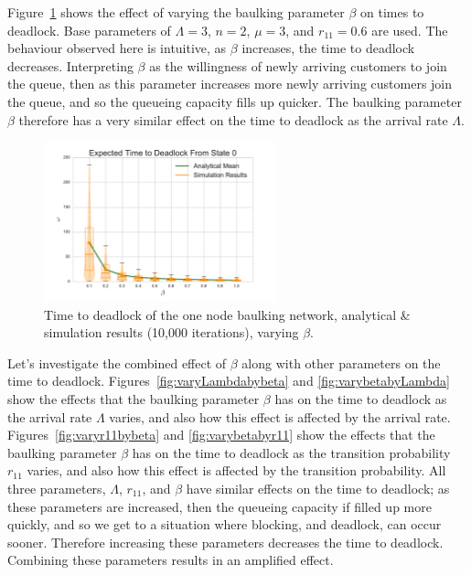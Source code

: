 \documentclass{article}
\begin{document}
Figure~\ref{fig:varybeta} shows the effect of varying the baulking parameter $\beta$ on times to deadlock. Base parameters of $\Lambda = 3$, $n = 2$, $\mu = 3$, and $r_{11} = 0.6$ are used.
The behaviour observed here is intuitive, as $\beta$ increases, the time to deadlock decreases. Interpreting $\beta$ as the willingness of newly arriving customers to join the queue, then as this parameter increases more newly arriving customers join the queue, and so the queueing capacity fills up quicker. The baulking parameter $\beta$ therefore has a very similar effect on the time to deadlock as the arrival rate $\Lambda$.

\begin{figure}
    \begin{center}
        \includegraphics[width=0.6\textwidth]{img/vary_beta.pdf}
    \end{center}
    \caption{Time to deadlock of the one node baulking network, analytical \& simulation results (10,000 iterations), varying $\beta$.}
    \label{fig:varybeta}
\end{figure}

Let's investigate the combined effect of $\beta$ along with other parameters on the time to deadlock.
Figures~\ref{fig:varyLambdabybeta} and \ref{fig:varybetabyLambda} show the effects that the baulking parameter $\beta$ has on the time to deadlock as the arrival rate $\Lambda$ varies, and also how this effect is affected by the arrival rate.
Figures~\ref{fig:varyr11bybeta} and \ref{fig:varybetabyr11} show the effects that the baulking parameter $\beta$ has on the time to deadlock as the transition probability $r_{11}$ varies, and also how this effect is affected by the transition probability.
All three parameters, $\Lambda$, $r_{11}$, and $\beta$ have similar effects on the time to deadlock; as these parameters are increased, then the queueing capacity if filled up more quickly, and so we get to a situation where blocking, and deadlock, can occur sooner. Therefore increasing these parameters decreases the time to deadlock.
Combining these parameters results in an amplified effect.
\end{document}

